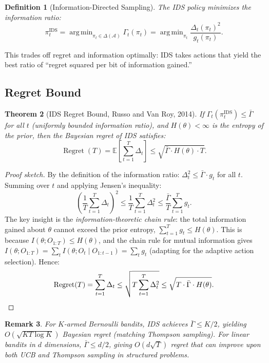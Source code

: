\documentclass[11pt,a4paper]{article}
\newtheorem{theorem}{Theorem}[section]
\newtheorem{definition}[theorem]{Definition}
\newtheorem{remark}[theorem]{Remark}
\newcommand{\E}{\mathbb{E}}
\newcommand{\cA}{\mathcal{A}}
\DeclareMathOperator*{\argmin}{arg\,min}
\DeclareMathOperator{\Regret}{Regret}
\begin{document}
\begin{definition}[Information-Directed Sampling]
The IDS policy minimizes the information ratio:
\[
  \pi_t^{\mathrm{IDS}} = \argmin_{\pi_t \in \Delta(\cA)} \Gamma_t(\pi_t)
  = \argmin_{\pi_t} \frac{\Delta_t(\pi_t)^2}{g_t(\pi_t)}.
\]
\end{definition}

This trades off regret and information optimally: IDS takes actions that yield the
best ratio of ``regret squared per bit of information gained.''

\subsection{Regret Bound}

\begin{theorem}[IDS Regret Bound, Russo and Van Roy, 2014]
\label{thm:ids-regret}
If $\Gamma_t(\pi_t^{\mathrm{IDS}}) \leq \bar{\Gamma}$ for all $t$ (uniformly bounded
information ratio), and $H(\theta) < \infty$ is the entropy of the prior, then the
Bayesian regret of IDS satisfies:
\[
  \Regret(T) = \E\!\left[\sum_{t=1}^T \Delta_t\right] \leq \sqrt{\bar{\Gamma} \cdot H(\theta) \cdot T}.
\]
\end{theorem}

\begin{proof}[Proof sketch]
By the definition of the information ratio:
$\Delta_t^2 \leq \bar{\Gamma} \cdot g_t$ for all $t$.
Summing over $t$ and applying Jensen's inequality:
\[
  \left(\frac{1}{T}\sum_{t=1}^T \Delta_t\right)^2 \leq \frac{1}{T}\sum_{t=1}^T \Delta_t^2
  \leq \frac{\bar{\Gamma}}{T} \sum_{t=1}^T g_t.
\]
The key insight is the \emph{information-theoretic chain rule}: the total information
gained about $\theta$ cannot exceed the prior entropy,
$\sum_{t=1}^T g_t \leq H(\theta)$.
This is because $I(\theta; O_{1:T}) \leq H(\theta)$, and the chain rule for
mutual information gives $I(\theta; O_{1:T}) = \sum_t I(\theta; O_t \mid O_{1:t-1}) = \sum_t g_t$
(adapting for the adaptive action selection). Hence:
\[
  \Regret(T) = \sum_{t=1}^T \Delta_t \leq \sqrt{T \sum_{t=1}^T \Delta_t^2}
  \leq \sqrt{T \cdot \bar{\Gamma} \cdot H(\theta)}. \qedhere
\]
\end{proof}

\begin{remark}
For $K$-armed Bernoulli bandits, IDS achieves $\bar{\Gamma} \leq K/2$, yielding
$O(\sqrt{KT \log K})$ Bayesian regret (matching Thompson sampling). For linear
bandits in $d$ dimensions, $\bar{\Gamma} \leq d/2$, giving $O(d\sqrt{T})$ regret
that can \emph{improve} upon both UCB and Thompson sampling in structured problems.
\end{remark}
\end{document}
